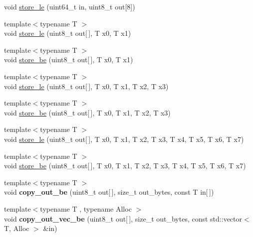 \begin{DoxyCompactItemize}
\item 
void \hyperlink{namespace_botan_ac123595229ef6588f851540b9b774800}{store\+\_\+le} (uint64\+\_\+t in, uint8\+\_\+t out\mbox{[}8\mbox{]})
\item 
{\footnotesize template$<$typename T $>$ }\\void \hyperlink{namespace_botan_a0bf3a60376720003e37586a548175426}{store\+\_\+le} (uint8\+\_\+t out\mbox{[}$\,$\mbox{]}, T x0, T x1)
\item 
{\footnotesize template$<$typename T $>$ }\\void \hyperlink{namespace_botan_adf2d43d6f22f9440efca19d126179271}{store\+\_\+be} (uint8\+\_\+t out\mbox{[}$\,$\mbox{]}, T x0, T x1)
\item 
{\footnotesize template$<$typename T $>$ }\\void \hyperlink{namespace_botan_a7ba9e7bbb06b5843eb883b1fdbe22848}{store\+\_\+le} (uint8\+\_\+t out\mbox{[}$\,$\mbox{]}, T x0, T x1, T x2, T x3)
\item 
{\footnotesize template$<$typename T $>$ }\\void \hyperlink{namespace_botan_a2c8b865c60e5d60524c7c79d66b4b120}{store\+\_\+be} (uint8\+\_\+t out\mbox{[}$\,$\mbox{]}, T x0, T x1, T x2, T x3)
\item 
{\footnotesize template$<$typename T $>$ }\\void \hyperlink{namespace_botan_a7b4ba47d9124f22d4f31e9a1e6522053}{store\+\_\+le} (uint8\+\_\+t out\mbox{[}$\,$\mbox{]}, T x0, T x1, T x2, T x3, T x4, T x5, T x6, T x7)
\item 
{\footnotesize template$<$typename T $>$ }\\void \hyperlink{namespace_botan_ac7562c0698d83b375aef50abc64bcdd2}{store\+\_\+be} (uint8\+\_\+t out\mbox{[}$\,$\mbox{]}, T x0, T x1, T x2, T x3, T x4, T x5, T x6, T x7)
\item 
\mbox{\label{namespace_botan_ae5951af5d67ee89f552e66abe8a19de7}} 
{\footnotesize template$<$typename T $>$ }\\void {\bfseries copy\+\_\+out\+\_\+be} (uint8\+\_\+t out\mbox{[}$\,$\mbox{]}, size\+\_\+t out\+\_\+bytes, const T in\mbox{[}$\,$\mbox{]})
\item 
\mbox{\label{namespace_botan_af10bb467867948b805d2ed47e520ee08}} 
{\footnotesize template$<$typename T , typename Alloc $>$ }\\void {\bfseries copy\+\_\+out\+\_\+vec\+\_\+be} (uint8\+\_\+t out\mbox{[}$\,$\mbox{]}, size\+\_\+t out\+\_\+bytes, const std\+::vector$<$ T, Alloc $>$ \&in)

\end{DoxyCompactItemize}
